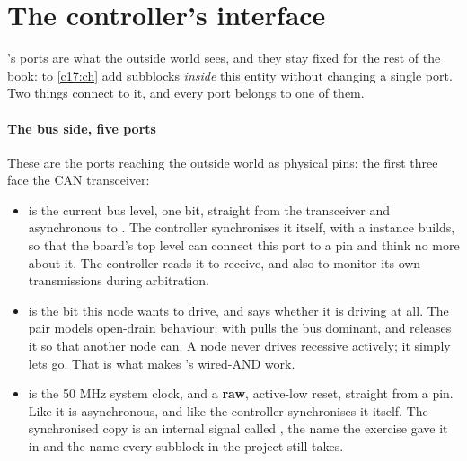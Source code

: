 \section{The controller's interface}
\label{c11:sec:interface}

's ports are what the outside world sees, and they stay fixed for the rest of
the book:  to \ref{c17:ch} add subblocks \emph{inside} this entity without changing a
single port. Two things connect to it, and every port belongs to one of them.


\paragraph{The bus side, five ports}
These are the ports reaching the outside world as physical pins; the first three face the CAN
transceiver:
\begin{itemize}
  \item {} is the current bus level, one bit, straight from the transceiver and
    asynchronous to . The controller synchronises it itself, with a 
    instance  builds, so that the board's top level can connect this port to a pin
    and think no more about it. The controller reads it to receive, and also to monitor its own
    transmissions during arbitration.
  \item {} is the bit this node wants to drive, and  says whether it is
    driving at all. The pair models open-drain behaviour:  with
     pulls the bus dominant, and  releases it so that another
    node can. A node never drives recessive actively; it simply lets go. That is what makes
    's wired-AND work.
  \item {} is the 50 MHz system clock, and  a \textbf{raw}, active-low reset,
    straight from a pin. Like  it is asynchronous, and like  the controller
    synchronises it itself. The synchronised copy is an internal signal called , the
    name the  exercise gave it in  and the name every subblock in the
    project still takes.
\end{itemize}

